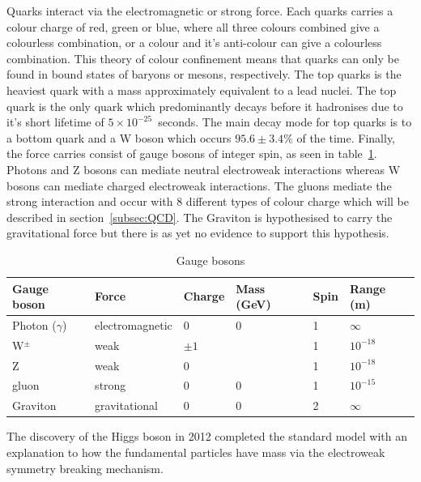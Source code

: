 Quarks interact via the electromagnetic or strong force. Each quarks carries a colour charge of red, green or blue, where all three colours combined give a colourless combination, or a colour and it's anti-colour can give a colourless combination. This theory of colour confinement means that quarks can only be found in bound states of baryons or mesons, respectively. 
The top quarks is the heaviest quark with a mass approximately equivalent to a lead nuclei. The top quark is the only quark which predominantly decays before it hadronises due to it's short lifetime of $5\times10^{-25}$~seconds. The main decay mode for top quarks is to a bottom quark and a W boson which occurs $95.6\pm3.4\%$ of the time.
Finally, the force carries consist of gauge bosons of integer spin, as seen in table~\ref{table:SMbosons}. Photons and Z bosons can mediate neutral electroweak interactions whereas W bosons can mediate charged electroweak interactions. The gluons mediate the strong interaction and occur with 8 different types of colour charge which will be described in section~\ref{subsec:QCD}. 
The Graviton is hypothesised to carry the gravitational force but there is as yet no evidence to support this hypothesis.
\begin{table}[ht!]
\centering
\caption{Gauge bosons}
\footnotesize
\label{table:SMbosons}
\begin{tabular}{|l|l|l|l|l|l|}
\hline
Gauge boson                       & Force           & Charge & Mass (GeV) & Spin & Range (m)  \\ \hline \hline
Photon ($\gamma$)                 & electromagnetic & 0      & 0          & 1    & $\infty$   \\ \hline
W$^{\pm}$                         & weak            & $\pm1$ &            & 1    & $10^{-18}$ \\ \hline
Z                                 & weak            & 0      &            & 1    & $10^{-18}$ \\ \hline
gluon                             & strong          & 0      & 0          & 1    & $10^{-15}$ \\ \hline
Graviton\footnote\{hypothesised\} & gravitational   & 0      & 0          & 2    & $\infty$   \\ \hline
\end{tabular}
\end{table}

The discovery of the Higgs boson in 2012 completed the standard model with an explanation to how the fundamental particles have mass via the electroweak symmetry breaking mechanism.


